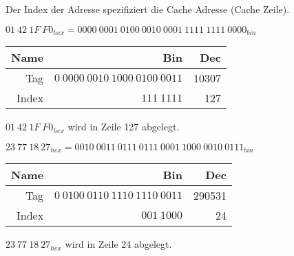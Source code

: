 \documentclass[10pt]{article}
\begin{document}
\begin{enumerate}[label=\alph*)]
		Der Index der Adresse spezifiziert die Cache Adresse (Cache Zeile).
		
		$01\:42\:1F\:F0_{hex} = 0000\:0001\:0100\:0010\:0001\:1111\:1111\:0000_{bin}$
		
		\begin{tabular}{r | r | r}
			Name & Bin & Dec\\
			\hline
			Tag & $0\:0000\:0010\:1000\:0100\:0011$ & 10307\\
			Index & $111\:1111$ & 127\\
		\end{tabular}

		$01\:42\:1F\:F0_{hex}$ wird in Zeile 127 abgelegt.
		
		$23\:77\:18\:27_{hex} = 0010\:0011\:0111\:0111\:0001\:1000\:0010\:0111_{bin}$
		
		\begin{tabular}{r | r | r}
			Name & Bin & Dec\\
			\hline
			Tag & $0\:0100\:0110\:1110\:1110\:0011$ & 290531\\
			Index & $001\:1000$ & 24\\
		\end{tabular}
		
		$23\:77\:18\:27_{hex}$ wird in Zeile 24 abgelegt.
		
\end{enumerate}
\end{document}
